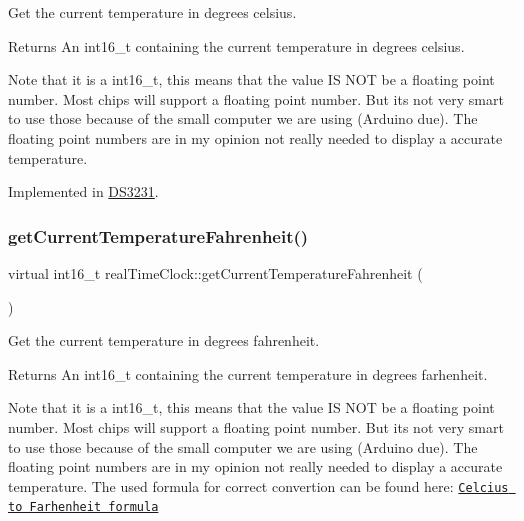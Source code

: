 Get the current temperature in degrees celsius. 

\begin{DoxyReturn}{Returns}
An int16\+\_\+t containing the current temperature in degrees celsius.
\end{DoxyReturn}
Note that it is a int16\+\_\+t, this means that the value IS N\+OT be a floating point number. Most chips will support a floating point number. But it\textquotesingle{}s not very smart to use those because of the small computer we are using (Arduino due). The floating point numbers are in my opinion not really needed to display a accurate temperature. 

Implemented in \mbox{\hyperlink{class_d_s3231_abd46c1cf5f5c78e3222c3677e70a1272}{D\+S3231}}.

\mbox{\label{classreal_time_clock_a8fe956100fc4e339cd68ab413465f666}} 
\subsubsection{\texorpdfstring{get\+Current\+Temperature\+Fahrenheit()}{getCurrentTemperatureFahrenheit()}}
{\footnotesize\ttfamily virtual int16\+\_\+t real\+Time\+Clock\+::get\+Current\+Temperature\+Fahrenheit (\begin{DoxyParamCaption}{ }\end{DoxyParamCaption})\hspace{0.3cm}{\ttfamily [pure virtual]}}



Get the current temperature in degrees fahrenheit. 

\begin{DoxyReturn}{Returns}
An int16\+\_\+t containing the current temperature in degrees farhenheit.
\end{DoxyReturn}
Note that it is a int16\+\_\+t, this means that the value IS N\+OT be a floating point number. Most chips will support a floating point number. But it\textquotesingle{}s not very smart to use those because of the small computer we are using (Arduino due). The floating point numbers are in my opinion not really needed to display a accurate temperature. The used formula for correct convertion can be found here\+: \href{https://www.rapidtables.com/convert/temperature/how-celsius-to-fahrenheit.html}{\tt Celcius to Farhenheit formula} 

